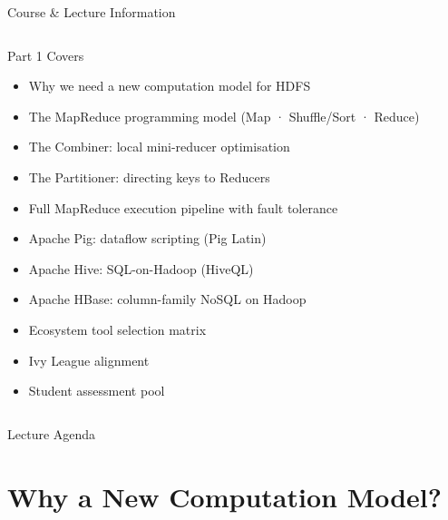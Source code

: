 \documentclass[aspectratio=169,10pt]{beamer}
\begin{document}
\begin{frame}{Course \& Lecture Information}
\begin{columns}[T]
      \begin{exampleblock}{Part 1 Covers}
        \begin{itemize}
          \item Why we need a new computation model for HDFS
          \item The MapReduce programming model (Map · Shuffle/Sort · Reduce)
          \item The Combiner: local mini-reducer optimisation
          \item The Partitioner: directing keys to Reducers
          \item Full MapReduce execution pipeline with fault tolerance
          \item Apache Pig: dataflow scripting (Pig Latin)
          \item Apache Hive: SQL-on-Hadoop (HiveQL)
          \item Apache HBase: column-family NoSQL on Hadoop
          \item Ecosystem tool selection matrix
          \item Ivy League alignment
          \item Student assessment pool
        \end{itemize}
      \end{exampleblock}
  \end{columns}
\end{frame}

\begin{frame}{Lecture Agenda}
  \tableofcontents
\end{frame}

\section{Why a New Computation Model?}
\end{document}
